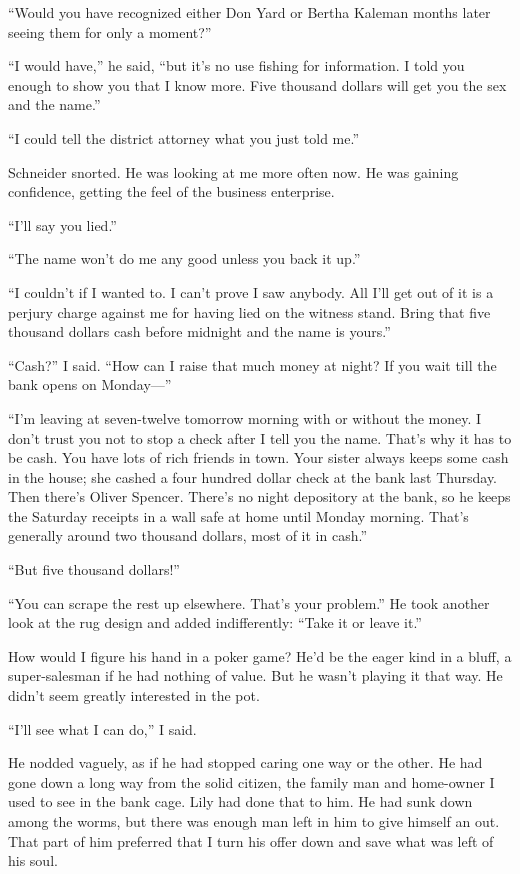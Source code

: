 \documentclass{novel}
\begin{document}
“Would you have recognized either Don Yard or Bertha Kaleman months later seeing them for only a moment?”

“I would have,” he said, “but it’s no use fishing for information. I told you enough to show you that I know more. Five thousand dollars will get you the sex and the name.”

“I could tell the district attorney what you just told me.”

Schneider snorted. He was looking at me more often now. He was gaining confidence, getting the feel of the business enterprise.

“I’ll say you lied.”

“The name won’t do me any good unless you back it up.”

“I couldn’t if I wanted to. I can’t prove I saw anybody. All I’ll get out of it is a perjury charge against me for having lied on the witness stand. Bring that five thousand dollars cash before midnight and the name is yours.”

“Cash?” I said. “How can I raise that much money at night? If you wait till the bank opens on Monday—”

“I’m leaving at seven-twelve tomorrow morning with or without the money. I don’t trust you not to stop a check after I tell you the name. That’s why it has to be cash. You have lots of rich friends in town. Your sister always keeps some cash in the house; she cashed a four hundred dollar check at the bank last Thursday. Then there’s Oliver Spencer. There’s no night depository at the bank, so he keeps the Saturday receipts in a wall safe at home until Monday morning. That’s generally around two thousand dollars, most of it in cash.”

“But five thousand dollars!”

“You can scrape the rest up elsewhere. That’s your problem.” He took another look at the rug design and added indifferently: “Take it or leave it.”

How would I figure his hand in a poker game? He’d be the eager kind in a bluff, a super-salesman if he had nothing of value. But he wasn’t playing it that way. He didn’t seem greatly interested in the pot.

“I’ll see what I can do,” I said.

He nodded vaguely, as if he had stopped caring one way or the other. He had gone down a long way from the solid citizen, the family man and home-owner I used to see in the bank cage. Lily had done that to him. He had sunk down among the worms, but there was enough man left in him to give himself an out. That part of him preferred that I turn his offer down and save what was left of his soul.
\end{document}
